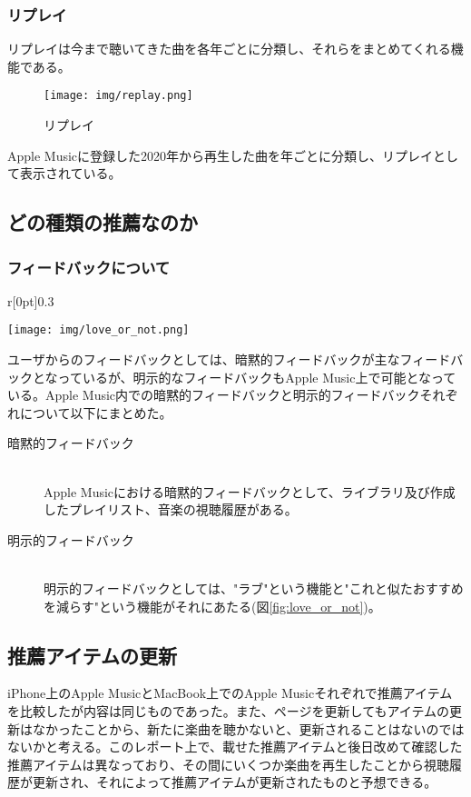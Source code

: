 \documentclass{jsarticle}
\begin{document}
\subsubsection{リプレイ}
リプレイは今まで聴いてきた曲を各年ごとに分類し、それらをまとめてくれる機能である。
\begin{figure}[htbp]
    \begin{center}
        \texttt{[image: img/replay.png]}
        \caption{リプレイ}
        \label{fig:replay}
    \end{center}
\end{figure}
\par Apple Musicに登録した2020年から再生した曲を年ごとに分類し、リプレイとして表示されている。
\subsection{どの種類の推薦なのか}
\subsubsection{フィードバックについて}
\begin{wrapfigure}{r}[0pt]{0.3\linewidth}
    \begin{center}
        \texttt{[image: img/love\_or\_not.png]}
        \caption{明示的フィードバック}
        \label{fig:love_or_not}
    \end{center}
\end{wrapfigure}
ユーザからのフィードバックとしては、暗黙的フィードバックが主なフィードバックとなっているが、明示的なフィードバックもApple Music上で可能となっている。Apple Music内での暗黙的フィードバックと明示的フィードバックそれぞれについて以下にまとめた。
\begin{description}
    \item[暗黙的フィードバック] \mbox{}\\
        Apple Musicにおける暗黙的フィードバックとして、ライブラリ及び作成したプレイリスト、音楽の視聴履歴がある。 
    \item[明示的フィードバック] \mbox{}\\
        明示的フィードバックとしては、"ラブ"という機能と"これと似たおすすめを減らす"という機能がそれにあたる(図\ref{fig:love_or_not})。
\end{description}
\subsection{推薦アイテムの更新}
iPhone上のApple MusicとMacBook上でのApple Musicそれぞれで推薦アイテムを比較したが内容は同じものであった。また、ページを更新してもアイテムの更新はなかったことから、新たに楽曲を聴かないと、更新されることはないのではないかと考える。このレポート上で、載せた推薦アイテムと後日改めて確認した推薦アイテムは異なっており、その間にいくつか楽曲を再生したことから視聴履歴が更新され、それによって推薦アイテムが更新されたものと予想できる。
\end{document}
